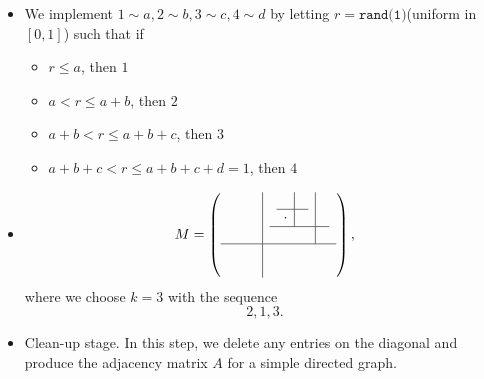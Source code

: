 \begin{remark}
	\begin{itemize}
		\item We implement \(1\sim a, 2\sim b, 3\sim c, 4\sim d\) by letting \(r = \texttt{rand(1)}\)(uniform in \([0, 1]\)) such that if
		      \begin{itemize}
			      \item \(r\leq a\), then \(1\)
			      \item \(a< r\leq a+b\), then \(2\)
			      \item \(a+b<r\leq a+b+c\), then \(3\)
			      \item \(a+b+c < r\leq a+b+c+d = 1\), then \(4\)
		      \end{itemize}
		\item \begin{eg}
			      \[
				      M = \left(
				      \begin{array}{c|c}
						      \begin{array}{cc}
							       & \\
							       &
						      \end{array} & \begin{array}{c|c}
							      \begin{array}{c|c}
								            & \\
								      \hline
								      \cdot &
							      \end{array} & \\
							      \hline
							                                 &
						      \end{array} \\
						      \hline
						      \begin{array}{cc}
							       & \\
							       &
						      \end{array} & \begin{array}{cc}
							       & \\
							       &
						      \end{array}
					      \end{array}
				      \right),
			      \]
			      where we choose \(k = 3\) with the sequence
			      \[
				      2, 1, 3.
			      \]
		      \end{eg}
		\item Clean-up stage. In this step, we delete any entries on the diagonal and produce the adjacency matrix \(A\) for a simple directed graph.
		      \begin{eg}

\end{eg}
\end{itemize}
\end{remark}
